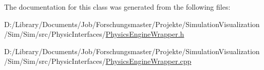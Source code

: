 The documentation for this class was generated from the following files\+:\begin{DoxyCompactItemize}
\item 
D\+:/\+Library/\+Documents/\+Job/\+Forschungsmaster/\+Projekte/\+Simulation\+Visualization/\+Sim/\+Sim/src/\+Physic\+Interfaces/\mbox{\hyperlink{_physics_engine_wrapper_8h}{Physics\+Engine\+Wrapper.\+h}}\item 
D\+:/\+Library/\+Documents/\+Job/\+Forschungsmaster/\+Projekte/\+Simulation\+Visualization/\+Sim/\+Sim/src/\+Physic\+Interfaces/\mbox{\hyperlink{_physics_engine_wrapper_8cpp}{Physics\+Engine\+Wrapper.\+cpp}}\end{DoxyCompactItemize}
